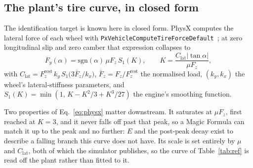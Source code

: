 \documentclass[lineno,12pt]{sn-jnl}
\theoremstyle{thmstyleone}%
\theoremstyle{thmstyletwo}%
\theoremstyle{thmstylethree}%
\begin{document}
\subsection{The plant's tire curve, in closed form}
\label{subsec:planttire}

The identification target is known here in closed form.
PhysX computes the lateral force of each wheel with
\texttt{PxVehicle\-Compute\-Tire\-Force\-Default}~\cite{physxvehicle}; at zero
longitudinal slip and zero camber that expression collapses to
\begin{equation}
F_{y}(\alpha)=\mathrm{sgn}(\alpha)\,\mu F_{z}\,S_{1}(K),\qquad
K=\frac{C_{\mathrm{lat}}|\tan\alpha|}{\mu F_{z}},
\label{eq:physx}
\end{equation}
with $C_{\mathrm{lat}}=F_{z}^{\mathrm{rest}}\,k_{y}\,
S_{1}\!\big(3\bar F_{z}/k_{x}\big)$, $\bar F_{z}=F_{z}/F_{z}^{\mathrm{rest}}$
the normalised load, $(k_{y},k_{x})$ the wheel's lateral-stiffness parameters,
and $S_{1}(K)=\min(1,\,K-K^{2}/3+K^{3}/27)$ the engine's smoothing function.

Two properties of Eq.~\eqref{eq:physx} matter downstream. It saturates at
$\mu F_{z}$, first reached at $K=3$, and it never falls off past that
peak, so a Magic Formula can match it up to the peak and no further: $E$ and
the post-peak decay exist to describe a falling branch this curve does not
have. Its
scale is set entirely by $\mu$ and $C_{\mathrm{lat}}$, both of which the
simulator publishes, so the curve of Table~\ref{tab:ref} is read off the plant
rather than fitted to it.
\end{document}
